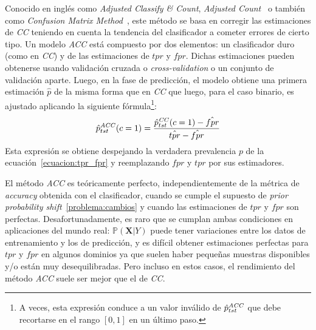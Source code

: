 Conocido en inglés como {\it Adjusted Classify \& Count}, {\it Adjusted
Count\/}~\cite{forman2008quantifying} o también como {\it Confusion Matrix
Method\/}~\cite{saerens2002adjusting}, este método se basa en corregir las
estimaciones de {\it CC\/} teniendo en cuenta la tendencia del clasificador a
cometer errores de cierto tipo. Un modelo {\it ACC\/} está compuesto por dos
elementos: un clasificador duro (como en {\it CC\/}) y de las estimaciones de
\(tpr\) y \(fpr\). Dichas estimaciones pueden obtenerse usando validación
cruzada o {\it cross-validation\/} o un conjunto de validación aparte. Luego, en
la fase de predicción, el modelo obtiene una primera estimación \(\hat p\) de la
misma forma que en {\it CC\/} que luego, para el caso binario, es ajustado
aplicando la siguiente fórmula\footnote{A veces, esta expresión conduce a un
valor inválido de \(\hat p^{\it ACC\/}_{tst}\) que debe recortarse en el rango
\([0, 1]\) en un último paso.}:
\begin{equation}
    \hat p^{\it ACC\/}_{tst}(c=1) = \frac{\hat p^{\it CC\/}_{tst}(c=1)-\hat{fpr}}{\hat{tpr} - \hat{fpr}}\label{ecuacion:acc_binaria}
\end{equation}
Esta expresión se obtiene despejando la verdadera prevalencia \(p\) de la
ecuación~\ref{ecuacion:tpr_fpr} y reemplazando \(fpr\) y \(tpr\) por sus
estimadores.

El método {\it ACC\/} es teóricamente perfecto, independientemente de la métrica
de {\it accuracy\/} obtenida con el clasificador, cuando se cumple el supuesto
de {\it prior probability shift\/}~\ref{problema:cambios} y cuando las
estimaciones de \(tpr\) y \(fpr\) son perfectas. Desafortunadamente, es raro que
se cumplan ambas condiciones en aplicaciones del mundo real:
\(\mathbb{P}(\boldsymbol{X}|Y)\) puede tener variaciones entre los datos de
entrenamiento y los de predicción, y es difícil obtener estimaciones perfectas
para \(tpr\) y \(fpr\) en algunos dominios ya que suelen haber pequeñas muestras
disponibles y/o están muy desequilibradas. Pero incluso en estos casos, el
rendimiento del método {\it ACC\/} suele ser mejor que el de {\it CC}.


